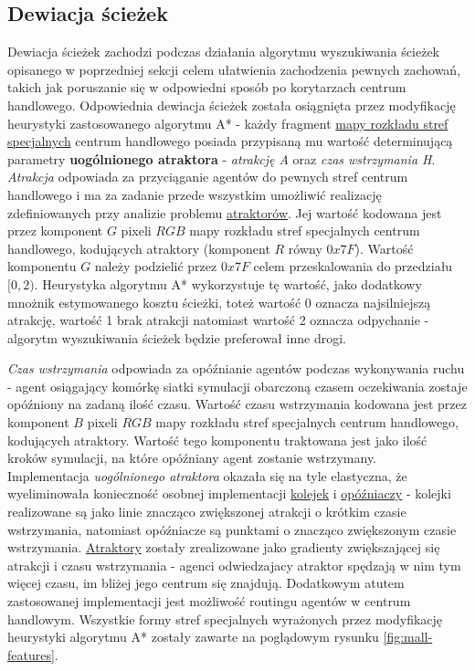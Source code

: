 \documentclass[a4paper, 12pt]{article}
\begin{document}
        \subsection{Dewiacja ścieżek}
        \label{sec:path-deviation}

        Dewiacja ścieżek zachodzi podczas działania algorytmu wyszukiwania ścieżek opisanego w poprzedniej sekcji celem ułatwienia zachodzenia pewnych zachowań, takich jak poruszanie się w odpowiedni sposób po korytarzach centrum handlowego. Odpowiednia dewiacja ścieżek została osiągnięta przez modyfikację heurystyki zastosowanego algorytmu A* - każdy fragment \hyperref[fig:mall-features]{mapy rozkładu stref specjalnych} centrum handlowego posiada przypisaną mu wartość determinującą parametry \textbf{uogólnionego atraktora} - \emph{atrakcję A} oraz \emph{czas wstrzymania H}. \\

        \emph{Atrakcja} odpowiada za przyciąganie agentów do pewnych stref centrum handlowego i ma za zadanie przede wszystkim umożliwić realizację zdefiniowanych przy analizie problemu \hyperref[sec:attractors]{atraktorów}. Jej wartość kodowana jest przez komponent $G$ pixeli $RGB$ mapy rozkładu stref specjalnych centrum handlowego, kodujących atraktory (komponent $R$ równy $0x7F$). Wartość komponentu $G$ należy podzielić przez $0x7F$ celem przeskalowania do przedziału $[0, 2)$. Heurystyka algorytmu A* wykorzystuje tę wartość, jako dodatkowy mnożnik estymowanego kosztu ścieżki, toteż wartość 0 oznacza najsilniejszą atrakcję, wartość 1 brak atrakcji natomiast wartość 2 oznacza odpychanie - algorytm wyszukiwania ścieżek będzie preferował inne drogi.

        \emph{Czas wstrzymania} odpowiada za opóźnianie agentów podczas wykonywania ruchu - agent osiągający komórkę siatki symulacji obarczoną czasem oczekiwania zostaje opóźniony na zadaną ilość czasu. Wartość czasu wstrzymania kodowana jest przez komponent $B$ pixeli $RGB$ mapy rozkładu stref specjalnych centrum handlowego, kodujących atraktory. Wartość tego komponentu traktowana jest jako ilość kroków symulacji, na które opóźniany agent zostanie wstrzymany. \\

Implementacja \emph{uogólnionego atraktora} okazała się na tyle elastyczna, że wyeliminowała konieczność osobnej implementacji \hyperref[sec:queues]{kolejek} i \hyperref[sec:holders]{opóźniaczy} - kolejki realizowane są jako linie znacząco zwiększonej atrakcji o krótkim czasie wstrzymania, natomiast opóźniacze są punktami o znacząco zwiększonym czasie wstrzymania. \hyperref[sec:attractors]{Atraktory} zostały zrealizowane jako gradienty zwiększającej się atrakcji i czasu wstrzymania - agenci odwiedzajacy atraktor spędzają w nim tym więcej czasu, im bliżej jego centrum się znajdują. Dodatkowym atutem zastosowanej implementacji jest możliwość routingu agentów w centrum handlowym. Wszystkie formy stref specjalnych wyrażonych przez modyfikację heurystyki algorytmu A* zostały zawarte na poglądowym rysunku \ref{fig:mall-features}.
\end{document}
